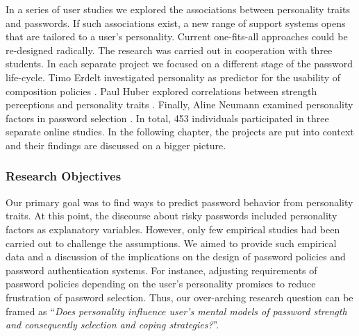 In a series of user studies we explored the associations between personality traits and passwords. If such associations exist, a new range of support systems opens that are tailored to a user's personality. Current one-fits-all approaches could be re-designed radically. The research was carried out in cooperation with three students. In each separate project we focused on a different stage of the password life-cycle. Timo Erdelt investigated personality as predictor for the usability of composition policies \cite{Erdelt2017BA}. Paul Huber explored correlations between strength perceptions and personality traits \cite{Huber2016BA}. Finally, Aline Neumann examined personality factors in password selection \cite{Neumann2017BA}. In total, 453 individuals participated in three separate online studies. In the following chapter, the projects are put into context and their findings are discussed on a bigger picture. 

\subsubsection*{Research Objectives}
Our primary goal was to find ways to predict password behavior from personality traits. At this point, the discourse about risky passwords included personality factors as explanatory variables. However, only few empirical studies had been carried out to challenge the assumptions. We aimed to provide such empirical data and a discussion of the implications on the design of password policies and password authentication systems. For instance, adjusting requirements of password policies depending on the user's personality promises to reduce frustration of password selection. Thus, our over-arching research question can be framed as ``\textit{Does personality influence user's mental models of password strength and consequently selection and coping strategies?}''.

%
%

